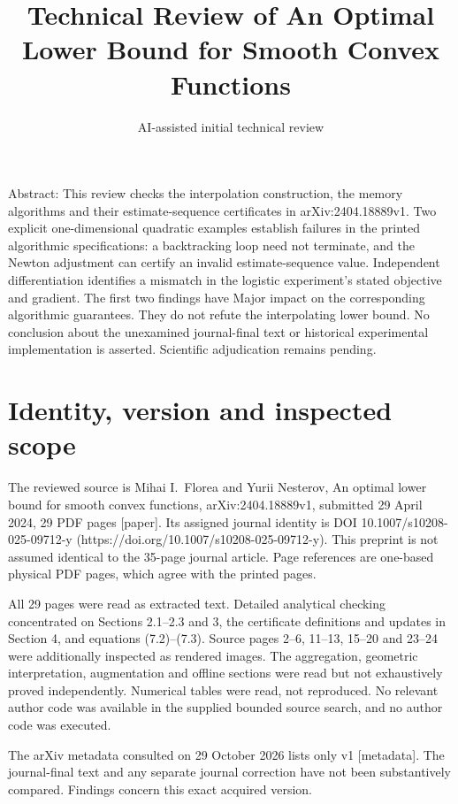 \documentclass[10pt]{article}
\title{Technical Review of
An Optimal Lower Bound for Smooth Convex Functions}
\author{AI-assisted initial technical review}
\date{}
\begin{document}
\maketitle
Abstract: This review checks the interpolation construction, the memory algorithms and their estimate-sequence certificates in arXiv:2404.18889v1. Two explicit one-dimensional quadratic examples establish failures in the printed algorithmic specifications: a backtracking loop need not terminate, and the Newton adjustment can certify an invalid estimate-sequence value. Independent differentiation identifies a mismatch in the logistic experiment’s stated objective and gradient. The first two findings have Major impact on the corresponding algorithmic guarantees. They do not refute the interpolating lower bound. No conclusion about the unexamined journal-final text or historical experimental implementation is asserted. Scientific adjudication remains pending.\par
\section*{Identity, version and inspected scope}
The reviewed source is Mihai I. Florea and Yurii Nesterov, An optimal lower bound for smooth convex functions, arXiv:2404.18889v1, submitted 29 April 2024, 29 PDF pages [paper]. Its assigned journal identity is DOI 10.1007/s10208-025-09712-y (https://doi.org/10.1007/s10208-025-09712-y). This preprint is not assumed identical to the 35-page journal article. Page references are one-based physical PDF pages, which agree with the printed pages.\par
All 29 pages were read as extracted text. Detailed analytical checking concentrated on Sections 2.1–2.3 and 3, the certificate definitions and updates in Section 4, and equations (7.2)–(7.3). Source pages 2–6, 11–13, 15–20 and 23–24 were additionally inspected as rendered images. The aggregation, geometric interpretation, augmentation and offline sections were read but not exhaustively proved independently. Numerical tables were read, not reproduced. No relevant author code was available in the supplied bounded source search, and no author code was executed.\par
The arXiv metadata consulted on 29 October 2026 lists only v1 [metadata]. The journal-final text and any separate journal correction have not been substantively compared. Findings concern this exact acquired version.\par
\end{document}
